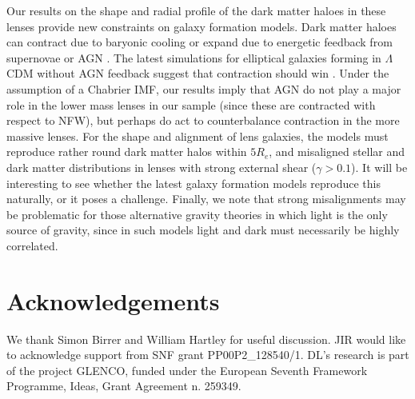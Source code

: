 \documentclass[useAMS,usenatbib]{mn2e}
\begin{document}
Our results on the shape and radial profile of the dark matter haloes in these lenses provide new constraints on galaxy formation models. Dark matter haloes can contract due to baryonic cooling \citep[e.g.][]{1986ApJ...301...27B} or expand due to energetic feedback from supernovae \citep[e.g.][]{2005MNRAS.356..107R,2012MNRAS.421.3464P,2014Natur.506..171P,2015arXiv150202036O,2015arXiv150804143R} or AGN \citep[e.g.][]{2012MNRAS.422.3081M}. The latest simulations for elliptical galaxies forming in $\Lambda$CDM without AGN feedback suggest that contraction should win \citep{2015MNRAS.453.2447D}. Under the assumption of a Chabrier IMF, our results imply that AGN do not play a major role in the lower mass lenses in our sample (since these are contracted with respect to NFW), but perhaps do act to counterbalance contraction in the more massive lenses. For the shape and alignment of lens galaxies, the models must reproduce rather round dark matter halos within $5R_e$, and misaligned stellar and dark matter distributions in lenses with strong external shear ($\gamma > 0.1$). It will be interesting to see whether the latest galaxy formation models reproduce this naturally, or it poses a challenge. Finally, we note that strong misalignments may be problematic for those alternative gravity theories in which light is the only source of gravity, since in such models light and dark must necessarily be highly correlated.


\section{Acknowledgements}\label{sec:acknowledgements}
We thank Simon Birrer and William Hartley for useful discussion. JIR would like to acknowledge support from SNF grant PP00P2\_128540/1. DL's research is part of the project GLENCO, funded under the European Seventh Framework Programme, Ideas, Grant Agreement n. 259349.





\appendix
\end{document}
